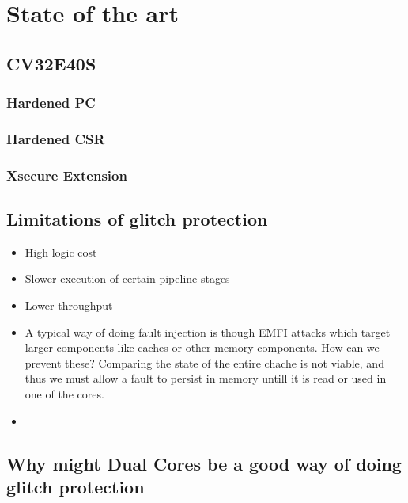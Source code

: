 \chapter{State of the art}
\label{chap3}

\section{CV32E40S}
\label{sec:cv32}

\subsection{Hardened PC}

\subsection{Hardened CSR}

\subsection{Xsecure Extension}

\section{Limitations of glitch protection}
\label{sec:limits}

\begin{itemize}
    \item High logic cost 
    \item Slower execution of certain pipeline stages
    \item Lower throughput 
    \item A typical way of doing fault injection is though EMFI attacks which target larger components like caches or other memory components.
    How can we prevent these? Comparing the state of the entire chache is not viable, and thus we must allow a fault to persist in 
    memory untill it is read or used in one of the cores.
    \item 
\end{itemize}

\section{Why might Dual Cores be a good way of doing glitch protection}

